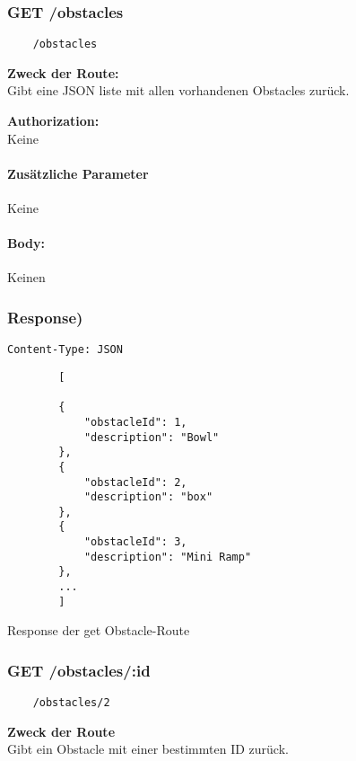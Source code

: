 \label{/obstacles}

\subsubsection{GET /obstacles}

\begin{lstlisting}
    /obstacles
\end{lstlisting}

\textbf{Zweck der Route:} \\
Gibt  eine JSON liste mit allen vorhandenen Obstacles zurück.

\textbf{Authorization:} \\
Keine

\paragraph{Zusätzliche Parameter}
Keine

\paragraph{Body:}

Keinen

\subsubsection{Response)}
\begin{code}
    \lstinline{Content-Type: JSON}
    \begin{lstlisting}
        [
            
        {
            "obstacleId": 1,
            "description": "Bowl"
        },
        {
            "obstacleId": 2,
            "description": "box"
        },
        {
            "obstacleId": 3,
            "description": "Mini Ramp"
        },
        ...
        ]
    \end{lstlisting}
    \caption{Response der get Obstacle-Route}
\end{code}

\pagebreak

\subsubsection{GET /obstacles/:id}

\begin{lstlisting}
    /obstacles/2
\end{lstlisting}

\textbf{Zweck der Route} \\
Gibt ein Obstacle mit einer bestimmten ID zurück.




